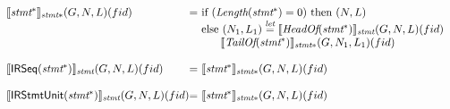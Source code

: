\[
\begin{array}{l@{}l@{~}l}
\transfun{\emph{stmt}^*}_{\emph{stmt}*}(G,N,L)(fid) & = & 
	\mbox{if}\ (\Length(\emph{stmt}^*) = 0)\ \mbox{then}\ (N,L)\\
	& & \mbox{else}\ (N_1,L_1) \letval \transfun{\HeadOf(\emph{stmt}^*)}_{\emph{stmt}}(G,N,L)(fid)\\
	& & \phantom{else} \transfun{\TailOf(\emph{stmt}^*)}_{\emph{stmt}*}(G,N_1,L_1)(fid)\\
	& & \\

\transfun{\irseq{\emph{stmt}^*}}_{\emph{stmt}}(G,N,L)(fid) & = & 
	\transfun{\emph{stmt}^*}_{\emph{stmt}*}(G,N,L)(fid)\\
	& & \\

\transfun{\irstmtunit{\emph{stmt}^*}}_{\emph{stmt}}(G,N,L)(fid) & = & 
	\transfun{\emph{stmt}^*}_{\emph{stmt}*}(G,N,L)(fid)\\
	& & \\


\end{array}\]
